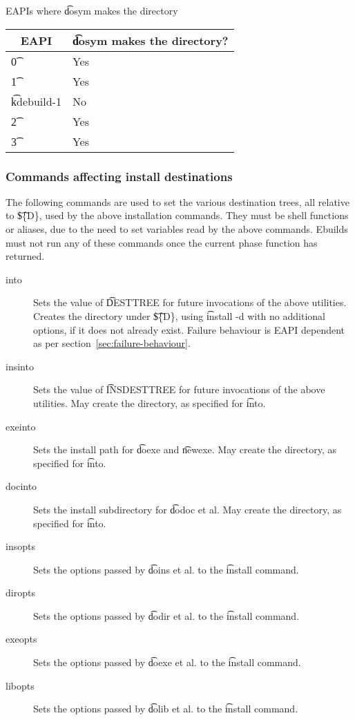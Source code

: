 \IFKDEBUILDELSE
{
    \begin{centertable}{EAPIs where \t{dosym} makes the directory} \label{tab:dosym-table}
    \begin{tabular}{ l l }
        \toprule
        \multicolumn{1}{c}{\textbf{EAPI}} &
        \multicolumn{1}{c}{\textbf{\t{dosym} makes the directory?}} \\
        \midrule
    \t{0} & Yes \\
    \t{1} & Yes \\
    \t{kdebuild-1} & No \\
    \t{2} & Yes \\
    \t{3} & Yes \\
    \bottomrule
    \end{tabular}
    \end{centertable}
}{
}

\subsubsection{Commands affecting install destinations}
The following commands are used to set the various destination trees, all relative to \t{\$\{D\}},
used by the above installation commands. They must be shell functions or aliases, due to the need to
set variables read by the above commands. Ebuilds must not run any of these commands once the
current phase function has returned.

\begin{description}

\item[into] Sets the value of \t{DESTTREE} for future invocations of the above utilities.  Creates
the directory under \t{\$\{D\}}, using \t{install -d} with no additional options, if it does not
already exist. Failure behaviour is EAPI dependent as per section~\ref{sec:failure-behaviour}.

\item[insinto] Sets the value of \t{INSDESTTREE} for future invocations of the above utilities. May
    create the directory, as specified for \t{into}.

\item[exeinto] Sets the install path for \t{doexe} and \t{newexe}. May create the directory, as specified
    for \t{into}.

\item[docinto] Sets the install subdirectory for \t{dodoc} et al. May create the directory, as specified
    for \t{into}.

\item[insopts] Sets the options passed by \t{doins} et al. to the \t{install} command.

\item[diropts] Sets the options passed by \t{dodir} et al. to the \t{install} command.

\item[exeopts] Sets the options passed by \t{doexe} et al. to the \t{install} command.

\item[libopts] Sets the options passed by \t{dolib} et al. to the \t{install} command.

\end{description}

